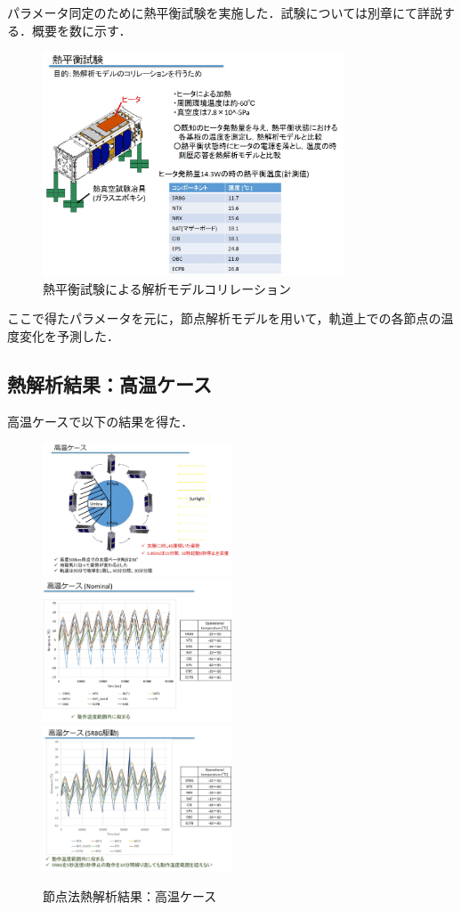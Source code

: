パラメータ同定のために熱平衡試験を実施した．試験については別章にて詳説する．概要を数に示す．
\begin{figure}[H]
	\centering
	\includegraphics[width=0.8\textwidth]{03/fig/3-7-2.jpg}
	\caption{熱平衡試験による解析モデルコリレーション}
	\label{fig3-7-2}
\end{figure}
ここで得たパラメータを元に，節点解析モデルを用いて，軌道上での各節点の温度変化を予測した．

\subsection{熱解析結果：高温ケース}
高温ケースで以下の結果を得た．
\begin{figure}[H]
	\centering
	\includegraphics[width=0.5\textwidth]{03/fig/3-7-3.jpg}
		\includegraphics[width=0.5\textwidth]{03/fig/3-7-4.jpg}
				\includegraphics[width=0.5\textwidth]{03/fig/3-7-5.jpg}
	\caption{節点法熱解析結果：高温ケース}
	\label{fig3-7-3}
\end{figure}

